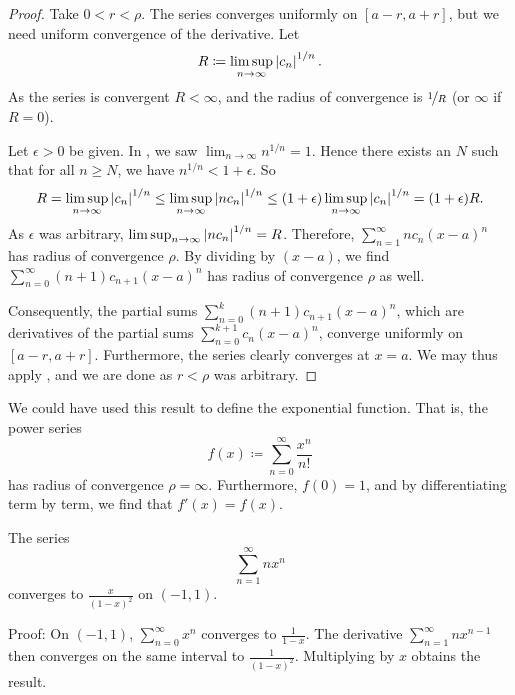 \begin{proof}
Take $0 < r < \rho$.
The series converges uniformly on
$[a-r,a+r]$,
but we need uniform convergence of the derivative.
Let
\begin{equation*}
R \coloneqq \limsup_{n \to \infty} \left\lvert {c_n} \right\rvert^{1/n} .
\end{equation*}
As the series is convergent $R < \infty$, and
the radius of convergence is $\nicefrac{1}{R}$ (or $\infty$ if $R=0$).

Let $\epsilon > 0$ be given.  In ,
we saw $\lim_{n\to\infty} n^{1/n} = 1$.
Hence there exists an $N$ such that for all $n \geq N$, we have
$n^{1/n} < 1+\epsilon$.
So
\begin{equation*}
R = 
\limsup_{n \to \infty}
\left\lvert {c_n} \right\rvert^{1/n}
\leq
\limsup_{n \to \infty}
\left\lvert {n c_n} \right\rvert^{1/n}
\leq
(1+\epsilon)
\limsup_{n \to \infty}
\left\lvert {c_n} \right\rvert^{1/n}
=
(1+\epsilon)R .
\end{equation*}
As $\epsilon$ was arbitrary, $\limsup_{n \to \infty} \left\lvert {n c_n} \right\rvert^{1/n} = R$.
Therefore, $\sum_{n=1}^\infty n c_{n} {(x-a)}^{n}$ has radius of
convergence $\rho$.  By dividing by $(x-a)$, we find
$\sum_{n=0}^\infty (n+1) c_{n+1} {(x-a)}^{n}$ has radius of convergence
$\rho$ as well.

Consequently, the partial sums 
$\sum_{n=0}^k (n+1) c_{n+1} {(x-a)}^{n}$,
which are derivatives of the partial sums
$\sum_{n=0}^{k+1} c_{n} {(x-a)}^{n}$,
converge uniformly on $[a-r,a+r]$.  Furthermore,
the series clearly converges at $x=a$.
We may thus apply , and
we are done as $r < \rho$ was arbitrary.
\end{proof}

\begin{example} \label{example:exponentialbypowerseries}
We could have used this result to define the exponential function.  That is,
the power series
\begin{equation*}
f(x) \coloneqq \sum_{n=0}^\infty \frac{x^n}{n!}
\end{equation*}
has radius of convergence $\rho=\infty$.  Furthermore,
$f(0) = 1$, and by differentiating
term by term, we find that $f'(x) = f(x)$.
\end{example}

\begin{example}
The series
\begin{equation*}
\sum_{n=1}^\infty n x^n
\end{equation*}
converges to $\frac{x}{{(1-x)}^2}$ on $(-1,1)$.

Proof:
On $(-1,1)$, $\sum_{n=0}^\infty x^n$ converges to
$\frac{1}{1-x}$.  The derivative $\sum_{n=1}^\infty n x^{n-1}$ then converges
on the same interval to $\frac{1}{{(1-x)}^2}$.  Multiplying by $x$
obtains the result.
\end{example}

